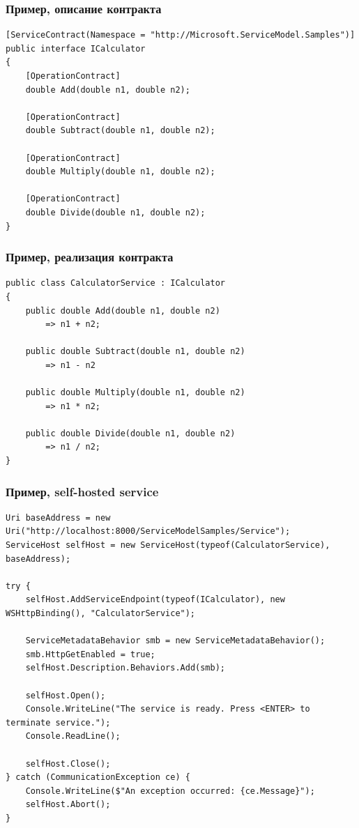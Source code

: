 \documentclass{../../slides-style}
\begin{document}
    \begin{frame}[fragile]
        \frametitle{Пример, описание контракта}
        \begin{small}
            \begin{verbatim}
[ServiceContract(Namespace = "http://Microsoft.ServiceModel.Samples")]  
public interface ICalculator  
{
    [OperationContract]
    double Add(double n1, double n2);

    [OperationContract]
    double Subtract(double n1, double n2);

    [OperationContract]
    double Multiply(double n1, double n2);

    [OperationContract]
    double Divide(double n1, double n2);
}
            \end{verbatim}
        \end{small}
    \end{frame}

    \begin{frame}[fragile]
        \frametitle{Пример, реализация контракта}
        \begin{small}
            \begin{verbatim}
public class CalculatorService : ICalculator  
{
    public double Add(double n1, double n2)
        => n1 + n2;  

    public double Subtract(double n1, double n2)
        => n1 - n2

    public double Multiply(double n1, double n2)  
        => n1 * n2;

    public double Divide(double n1, double n2)  
        => n1 / n2;
}
            \end{verbatim}
        \end{small}
    \end{frame}

    \begin{frame}[fragile]
        \frametitle{Пример, self-hosted service}
        \begin{scriptsize}
            \begin{verbatim}
Uri baseAddress = new Uri("http://localhost:8000/ServiceModelSamples/Service");
ServiceHost selfHost = new ServiceHost(typeof(CalculatorService), baseAddress);

try {
    selfHost.AddServiceEndpoint(typeof(ICalculator), new WSHttpBinding(), "CalculatorService");

    ServiceMetadataBehavior smb = new ServiceMetadataBehavior();
    smb.HttpGetEnabled = true;
    selfHost.Description.Behaviors.Add(smb);

    selfHost.Open();
    Console.WriteLine("The service is ready. Press <ENTER> to terminate service.");
    Console.ReadLine();

    selfHost.Close();  
} catch (CommunicationException ce) {
    Console.WriteLine($"An exception occurred: {ce.Message}");
    selfHost.Abort();
}
            \end{verbatim}
        \end{scriptsize}
    \end{frame}
\end{document}
